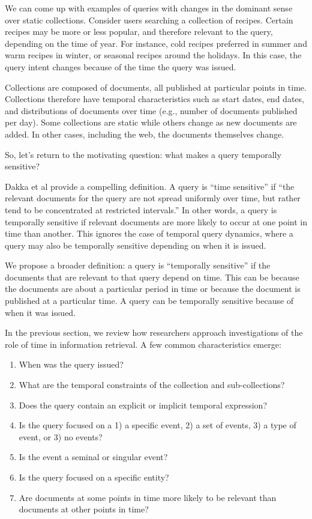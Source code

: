 \documentclass{sig-alternate}
\begin{document}
We can come up with examples of queries with changes in the dominant sense over static collections.  Consider users searching a collection of recipes.  Certain recipes may be more or less popular, and therefore relevant to the query, depending on the time of year. For instance, cold recipes preferred in summer and warm recipes in winter, or seasonal recipes around the holidays. In this case, the query intent changes because of the time the query was issued. 

Collections are composed of documents, all published at particular points in time. Collections therefore have temporal characteristics such as start dates, end dates, and distributions of documents over time (e.g., number of documents published per day). Some collections are static while others change as new documents are added. In other cases, including the web, the documents themselves change.  

So, let's return to the motivating question: what makes a query temporally sensitive?

Dakka et al provide a compelling definition.  A query is ``time sensitive''  if  ``the relevant documents for the query are not spread uniformly over time, but rather tend to be concentrated at restricted intervals.'' In other words, a query is temporally sensitive if relevant documents are more likely to occur at one point in time than another.  This ignores the case of temporal query dynamics,  where a query may also be temporally sensitive depending on when it is issued.

We propose a broader definition: a query is ``temporally sensitive'' if the documents that are relevant to that query depend on time. This can be because the documents are about a particular period in time or because the document is published at a particular time.  A query can be temporally sensitive because of when it was issued.  

In the previous section, we review how researchers approach investigations of the role of time in information retrieval.  A few common characteristics emerge:

\begin{enumerate}
\item When was the query issued?
\item What are the temporal constraints of the collection and sub-collections?
\item Does the query contain an explicit or implicit temporal expression?
\item Is the query focused on a 1) a specific event, 2) a set of events, 3) a type of event, or 3) no events?
\item Is the event a seminal or singular event?
\item Is the query focused on a specific entity?
\item Are documents at some points in time more likely to be relevant than documents at other points in time?
\end{enumerate}
\end{document}

